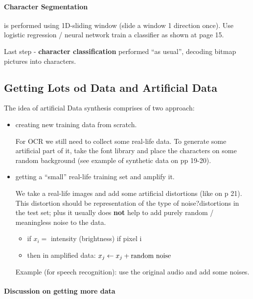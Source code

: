 \documentclass{scrartcl}
\begin{document}
\paragraph{Character Segmentation} 

is performed using 1D-sliding window (slide a window 1 direction
once). Use logistic regression / neural network train a classifier as
shown at page 15. 

Last step - {\bf character classification} performed ``as usual'',
decoding bitmap pictures into characters.

\subsection{Getting Lots od Data and Artificial Data}
\label{sec:18-3}

The idea of artificial Data synthesis comprises of two approach:
\begin{itemize}
\item creating new training data from scratch.

For OCR we still need to collect some real-life data. To generate some
artificial part of it, take the font library and place the characters
on some random background (see example of synthetic data on pp 19-20).

\item getting a ``small'' real-life training set and amplify it.

We take a real-life images and add some artificial distortions (like
on p 21). This distortion should be representation of the type of
noise?distortions in the test set; plus it usually does {\bf not} help
to add purely random / meaningless noise to the data.
\begin{itemize}
\item if $x_i = $ intensity (brightness) if pixel i
\item then in amplified data: $x_j \leftarrow x_j + \textnormal{random noise}$
\end{itemize}

Example (for speech recognition): use the original audio and add some
noises. 
\end{itemize}

\paragraph{Discussion on getting more data}
\end{document}
